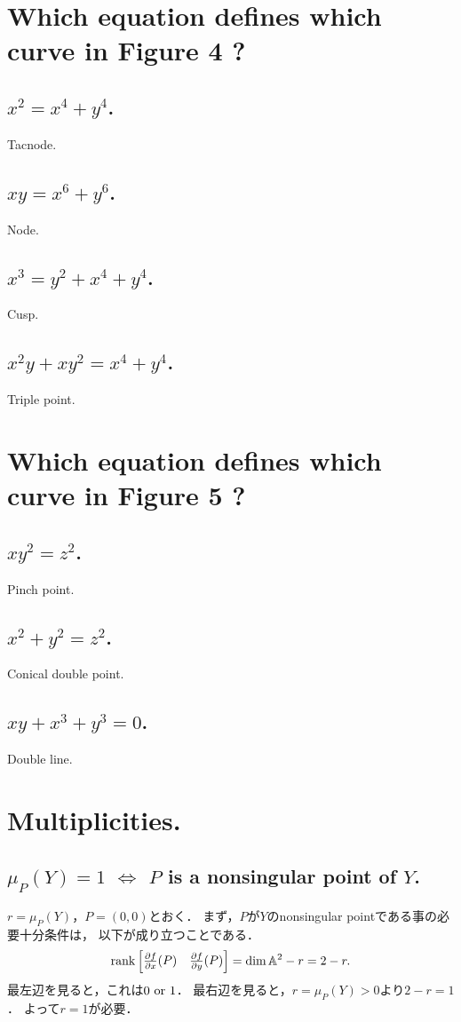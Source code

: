 \documentclass[a4paper]{jsarticle}
\begin{document}
\section{Which equation defines which curve in Figure 4 ?} %
    \subsection{$x^2=x^4+y^4$.} Tacnode.
    \subsection{$xy=x^6+y^6$.} Node.
    \subsection{$x^3=y^2+x^4+y^4$.} Cusp.
    \subsection{$x^2 y+x y^2=x^4+y^4$.} Triple point.

\section{Which equation defines which curve in Figure 5 ?} %
    \subsection{$xy^2=z^2$.} Pinch point.
    \subsection{$x^2+y^2=z^2$.} Conical double point.
    \subsection{$xy+x^3+y^3=0$.} Double line.

\section{Multiplicities.} %
    \subsection{$\mu_P(Y)=1$ $\iff$ $P$ is a nonsingular point of $Y$.}
    $r=\mu_P(Y)$，$P=(0,0)$とおく．
    まず，$P$が$Y$のnonsingular pointである事の必要十分条件は，
    以下が成り立つことである．
    \[
        \operatorname{rank}
        \begin{bmatrix}
            \frac{\partial f}{\partial x}(P) & \frac{\partial f}{\partial y}(P)
        \end{bmatrix}
        =\dim \mathbb{A}^2-r
        =2-r.
    \]
    最左辺を見ると，これは$0 \text{ or } 1$．
    最右辺を見ると，$r=\mu_P(Y)>0$より$2-r=1$．
    よって$r=1$が必要．
\end{document}
